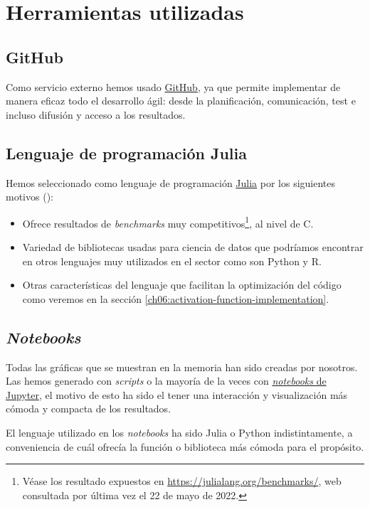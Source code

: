 
\section{Herramientas utilizadas}
\label{ch01:Herramientas}
\subsection{GitHub}
Como servicio externo hemos usado \href{https://github.com}{GitHub}, ya que permite implementar de manera eficaz
 todo el desarrollo ágil: 
desde la planificación, comunicación, test e incluso difusión y acceso a los resultados. 

\subsection{Lenguaje de programación Julia}
Hemos seleccionado como lenguaje de programación \href{https://julialang.org}{Julia} 
por los siguientes motivos (\cite{virtudes-de-julia}): 
\begin{itemize}
    \item Ofrece resultados de \textit{benchmarks} 
    muy competitivos\footnote{Véase los resultado expuestos en 
    \url{https://julialang.org/benchmarks/}, 
    web consultada por última vez el 22 de mayo de 2022.},
    al nivel de C.
    \item Variedad de bibliotecas usadas para ciencia de datos que podríamos encontrar 
    en otros lenguajes muy utilizados en el sector como son Python y R. 
    \item Otras características del lenguaje que facilitan 
    la optimización del código como veremos en la sección \ref{ch06:activation-function-implementation}. 
\end{itemize}

\subsection{\textit{Notebooks}}

Todas las gráficas que se muestran en la memoria han sido creadas por nosotros. 
Las hemos generado con \textit{scripts} o la mayoría de la veces con 
\href{https://jupyter.org}{\textit{notebooks} de Jupyter}, el motivo de esto ha 
sido el tener una interacción y visualización más cómoda y compacta de los resultados.

El lenguaje utilizado en los \textit{notebooks} ha sido Julia o Python indistintamente,
a conveniencia de cuál ofrecía la función o biblioteca más cómoda para el propósito.  


 